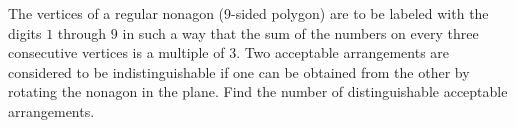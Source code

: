 The vertices of a regular nonagon (9-sided polygon) are to be labeled with the digits $1$ through $9$ in such a way that the sum of the numbers on every three consecutive vertices is a multiple of $3$. Two acceptable arrangements are considered to be indistinguishable if one can be obtained from the other by rotating the nonagon in the plane. Find the number of distinguishable acceptable arrangements.